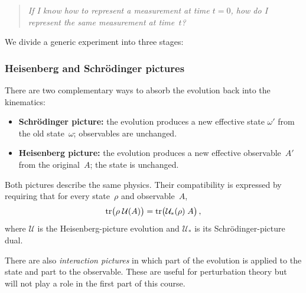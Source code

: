 \begin{quote}
  \emph{If I know how to represent a measurement at time $t=0$, how
  do I represent the same measurement at time~$t$?}
\end{quote}

We divide a generic experiment into three stages:

\begin{center}
\end{center}

\subsubsection{Heisenberg and Schr\"odinger pictures}%
\label{sec:pictures}

There are two complementary ways to absorb the evolution back into the
kinematics:

\begin{itemize}
  \item \textbf{Schr\"odinger picture:} the evolution produces a new
    effective state $\omega'$ from the old state~$\omega$; observables
    are unchanged.
  \item \textbf{Heisenberg picture:} the evolution produces a new
    effective observable~$A'$ from the original~$A$; the state is
    unchanged.
\end{itemize}
Both pictures describe the same physics.  Their compatibility is
expressed by requiring that for every state~$\rho$ and
observable~$A$,
\begin{equation}\label{eq:pictures-compat}
  \operatorname{tr}\bigl(\rho\;\mathcal{U}(A)\bigr)
    = \operatorname{tr}\bigl(\mathcal{U}_*({\rho})\;A\bigr)\,,
\end{equation}
where $\mathcal{U}$ is the Heisenberg-picture evolution and
$\mathcal{U}_*$ is its Schr\"odinger-picture dual.

\begin{remark}
  There are also \emph{interaction pictures} in which part of the
  evolution is applied to the state and part to the observable.  These
  are useful for perturbation theory but will not play a role in the
  first part of this course.
\end{remark}

